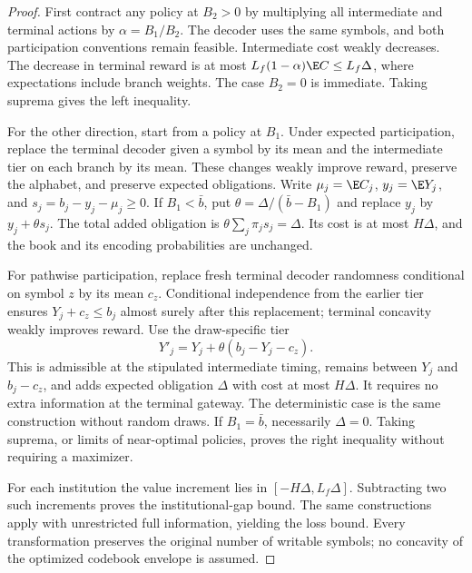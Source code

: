 \begin{proof}
First contract any policy at $B_2>0$ by multiplying all intermediate and terminal actions by $\alpha=B_1/B_2$. The decoder uses the same symbols, and both participation conventions remain feasible. Intermediate cost weakly decreases. The decrease in terminal reward is at most $L_f(1-\alpha)\E C\leq L_f\Delta$, where expectations include branch weights. The case $B_2=0$ is immediate. Taking suprema gives the left inequality.

For the other direction, start from a policy at $B_1$. Under expected participation, replace the terminal decoder given a symbol by its mean and the intermediate tier on each branch by its mean. These changes weakly improve reward, preserve the alphabet, and preserve expected obligations. Write $\mu_j=\E C_j$, $y_j=\E Y_j$, and $s_j=b_j-y_j-\mu_j\geq0$. If $B_1<\bar b$, put $\theta=\Delta/(\bar b-B_1)$ and replace $y_j$ by $y_j+\theta s_j$. The total added obligation is $\theta\sum_j\pi_js_j=\Delta$. Its cost is at most $H\Delta$, and the book and its encoding probabilities are unchanged.

For pathwise participation, replace fresh terminal decoder randomness conditional on symbol $z$ by its mean $c_z$. Conditional independence from the earlier tier ensures $Y_j+c_z\leq b_j$ almost surely after this replacement; terminal concavity weakly improves reward. Use the draw-specific tier
\[
 Y'_j=Y_j+\theta(b_j-Y_j-c_z).
\]
This is admissible at the stipulated intermediate timing, remains between $Y_j$ and $b_j-c_z$, and adds expected obligation $\Delta$ with cost at most $H\Delta$. It requires no extra information at the terminal gateway. The deterministic case is the same construction without random draws. If $B_1=\bar b$, necessarily $\Delta=0$. Taking suprema, or limits of near-optimal policies, proves the right inequality without requiring a maximizer.

For each institution the value increment lies in $[-H\Delta,L_f\Delta]$. Subtracting two such increments proves the institutional-gap bound. The same constructions apply with unrestricted full information, yielding the loss bound. Every transformation preserves the original number of writable symbols; no concavity of the optimized codebook envelope is assumed.
\end{proof}
